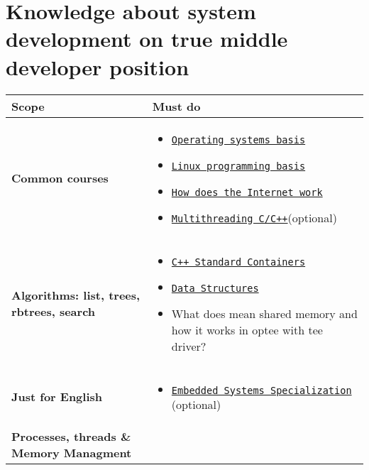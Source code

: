 \documentclass{article}
\begin{document}
	\section{Knowledge about system development on true middle developer position}
	\begin{tabular}{ | p{4cm} | p{15cm} | }
		\hline
		\textbf{Scope} & \textbf{Must do} \\
		\hline
		\vspace{5pt}
		\textbf{Common courses}
		&
		\begin{itemize}[noitemsep, topsep=5pt, parsep=0pt, partopsep=0pt]
			\item {\href{https://stepik.org/course/1780/syllabus}{\texttt{Operating systems basis}}}
			\item {\href{https://stepik.org/course/548/syllabus}{\texttt{Linux programming basis}}}
			\item {\href{https://stepik.org/course/14736/syllabus}{\texttt{How does the Internet work}}}
			\item {\href{https://stepik.org/course/149/syllabus}{\texttt{Multithreading C/C++}}(optional)}
		\end{itemize} \\
		\hline
		\vspace{5pt}
		\textbf{Algorithms: list, trees, rbtrees, search}
		&
		\begin{itemize}[noitemsep, topsep=5pt, parsep=0pt, partopsep=0pt]
			\item {\href{http://www.cplusplus.com/reference/stl/}{\texttt{C++ Standard Containers}}}
			\item \href{https://stepik.org/course/579/syllabus}{\texttt{Data Structures}}
			\item What does mean shared memory and how it works in optee with tee driver?
		\end{itemize} \\
		\hline
		\vspace{5pt}
		\textbf{Just for English}
		&
		\begin{itemize}[noitemsep, topsep=5pt, parsep=0pt, partopsep=0pt]
			\item \href{https://www.coursera.org/specializations/embedded-systems-security}{\texttt{Embedded Systems Specialization}} (optional)
		\end{itemize} \\
		\hline
		\vspace{5pt}
		\textbf{Processes, threads \& Memory Managment}
		&
		\begin{itemize}[noitemsep, topsep=5pt, parsep=0pt, partopsep=0pt]

\end{itemize}
\end{tabular}
\end{document}
